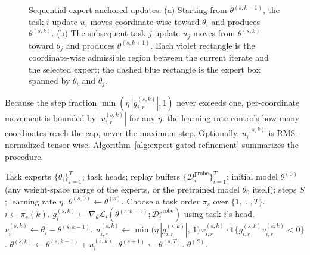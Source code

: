 \documentclass{article} %
\newcommand{\thetab}{\theta_0}
\newcommand{\loss}{\mathcal{L}}
\newcommand{\data}{\mathcal{D}}
\newcommand{\ind}{\mathbf{1}}
\begin{document}
\begin{figure}[t]
\centering
\resizebox{\linewidth}{!}{}
\caption{Sequential expert-anchored updates. (a) Starting from $\theta^{(s,k-1)}$, the task-$i$ update $u_i$ moves coordinate-wise toward $\theta_i$ and produces $\theta^{(s,k)}$. (b) The subsequent task-$j$ update $u_j$ moves from $\theta^{(s,k)}$ toward $\theta_j$ and produces $\theta^{(s,k+1)}$. Each violet rectangle is the coordinate-wise admissible region between the current iterate and the selected expert; the dashed blue rectangle is the expert box spanned by $\theta_i$ and $\theta_j$.}
\label{fig:sequential-anchored-updates}
\end{figure}

Because the step fraction $\min(\eta\,|g_{i,r}^{(s,k)}|,1)$ never exceeds one, per-coordinate movement is bounded by $|v_{i,r}^{(s,k)}|$ for any $\eta$: the learning rate controls how many coordinates reach the cap, never the maximum step. Optionally, $u_i^{(s,k)}$ is RMS-normalized tensor-wise. Algorithm~\ref{alg:expert-gated-refinement} summarizes the procedure.

\begin{algorithm}[H]
\caption{Sequential expert-anchored gradient descent (XGD)}
\label{alg:expert-gated-refinement}
\footnotesize
\begin{algorithmic}[1]
\REQUIRE Task experts $\{\theta_i\}_{i=1}^T$; task heads; replay buffers $\{\data_i^{\mathrm{probe}}\}_{i=1}^T$; initial model $\theta^{(0)}$ (any weight-space merge of the experts, or the pretrained model $\thetab$ itself); steps $S$; learning rate $\eta$.
    \STATE $\theta^{(s,0)} \gets \theta^{(s)}$.
    \STATE Choose a task order $\pi_s$ over $\{1,\ldots,T\}$.
        \STATE $i \gets \pi_s(k)$.
        \STATE $g_i^{(s,k)} \gets \nabla_\theta \loss_i(\theta^{(s,k-1)};\data_i^{\mathrm{probe}})$ using task $i$'s head.
        \STATE $v_i^{(s,k)} \gets \theta_i - \theta^{(s,k-1)}$.
            \STATE $u_{i,r}^{(s,k)} \gets \min\bigl(\eta\,|g_{i,r}^{(s,k)}|,\,1\bigr)\,v_{i,r}^{(s,k)}\cdot\ind\{g_{i,r}^{(s,k)}v_{i,r}^{(s,k)} < 0\}$. 
        \ENDFOR
        \STATE $\theta^{(s,k)} \gets \theta^{(s,k-1)} + u_i^{(s,k)}$.
    \ENDFOR
    \STATE $\theta^{(s+1)} \gets \theta^{(s,T)}$.
\ENDFOR
\STATE \RETURN $\theta^{(S)}$.
\end{algorithmic}
\end{algorithm}
\end{document}
